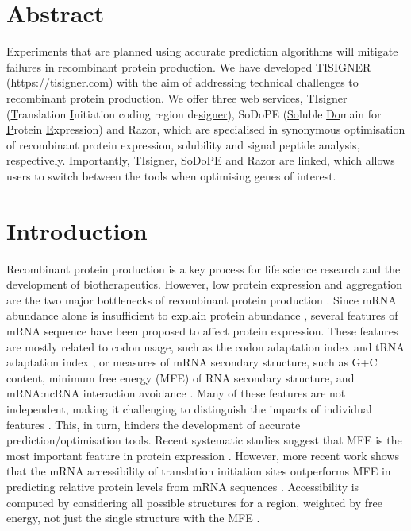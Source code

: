 \section{Abstract}
Experiments that are planned using accurate prediction algorithms will
mitigate failures in recombinant protein production. We have developed
TISIGNER (https://tisigner.com) with the aim of addressing technical
challenges to recombinant protein production. We offer three web
services, TIsigner (\underline{T}ranslation \underline{I}nitiation
coding region de\underline{signer}), SoDoPE (\underline{So}luble
\underline{Do}main for \underline{P}rotein \underline{E}xpression) and
Razor, which are specialised in synonymous optimisation of recombinant
protein expression, solubility and signal peptide analysis,
respectively. Importantly, TIsigner, SoDoPE and Razor are linked, which
allows users to switch between the tools when optimising genes of
interest.


\section{Introduction}

Recombinant protein production is a key process for life science
research and the development of biotherapeutics. However, low protein
expression and aggregation are the two major bottlenecks of recombinant
protein production \cite{Berlec2013-mb,Esposito2006-tj,Hou2018-yd,Kramer2012-wk,Mazurenko2020-pr,Rosano2014-oq,Vihinen2020-ar}.
Since mRNA abundance alone is insufficient to explain protein abundance \cite{Bernstein2002-gg,Abreu2009-zf,Lim2018-rq,Nieuwkoop2020-ph,Taniguchi2010-uq},
several features of mRNA sequence have been proposed to affect protein expression. 
These features are mostly related to codon usage, such as
the codon adaptation index and tRNA adaptation index
\cite{Brule2017-mx,Reis2004-dl,Gutman1989-pn,Sabi2014-je,Sharp1987-ed},
or measures of mRNA secondary structure, such as G+C content, minimum
free energy (MFE) of RNA secondary structure, and mRNA:ncRNA interaction
avoidance
\cite{De_Smit1990-xy,Dvir2013-wr,Kudla2009-tl,Plotkin2011-ak,Tuller2015-ts,Umu2016-zq}.
Many of these features are not independent, making it challenging to
distinguish the impacts of individual features
\cite{mauger2019mrna}. This, in turn, hinders
the development of accurate prediction/optimisation tools. Recent systematic 
studies suggest that MFE is the most important feature in
protein expression \cite{Cambray2018-kn,mauger2019mrna}. However, more 
recent work shows that the mRNA accessibility of translation initiation sites 
outperforms MFE in predicting relative protein levels from mRNA sequences
\cite{bhandari2019highly,Terai2020-co}. Accessibility
is computed by considering all possible structures for a region,
weighted by free energy, not just the single structure with the MFE \cite{Bernhart2006-ma}.

